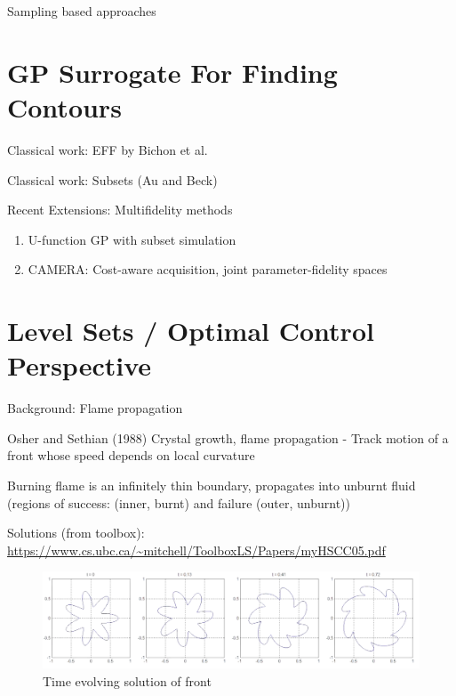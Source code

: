 \documentclass[usenames,dvipsnames]{beamer}
\theoremstyle{definition}
\begin{document}
\begin{frame}{Sampling based approaches}


\end{frame}

\section{GP Surrogate For Finding Contours}
\begin{frame}{Classical work: EFF by Bichon et al.}
    
\end{frame}

\begin{frame}{Classical work: Subsets (Au and Beck)}

\end{frame}

\begin{frame}{Recent Extensions: Multifidelity methods}
\begin{enumerate}
    \item U-function GP with subset simulation
    
    \item CAMERA: Cost-aware acquisition, joint parameter-fidelity spaces
\end{enumerate}

\end{frame}

\section{Level Sets / Optimal Control Perspective}
\begin{frame}{Background: Flame propagation}

Osher and Sethian (1988)
Crystal growth, flame propagation - Track motion of a front whose speed depends on local curvature

Burning flame is an infinitely thin boundary, propagates into unburnt fluid (regions of success: (inner, burnt) and failure (outer, unburnt))

Solutions (from toolbox): \url{https://www.cs.ubc.ca/~mitchell/ToolboxLS/Papers/myHSCC05.pdf}

\begin{figure}
    \centering
    \includegraphics[width=0.95\linewidth]{MitchellToolboxExample.png}
    \caption{Time evolving solution of front}
    \label{f: mtoolboxpde}
\end{figure}

\end{frame}
\end{document}
